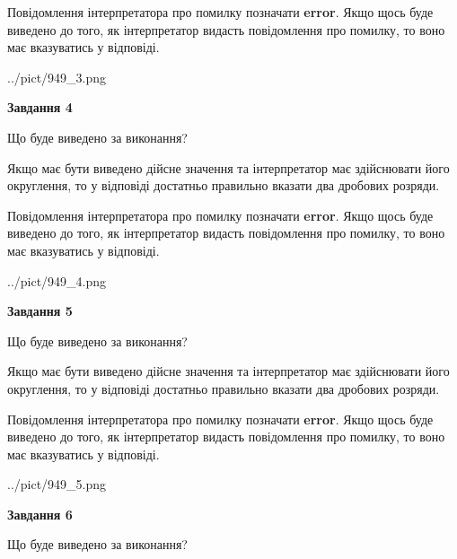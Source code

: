 \documentclass[12pt, ukrainian]{article}
\begin{document}
{\begin {Large}
Повідомлення інтерпретатора про помилку позначати \textbf{error}.
Якщо щось буде виведено до того, як інтерпретатор видасть повідомлення про помилку, 
то воно має вказуватись у відповіді. \par

\begin{center}
	{../pict/949_3.png}
\end{center}
\newpage

{\begin {center}\textbf{Завдання 4}\end {center}}\par
Що буде виведено за виконання? \par

Якщо має бути виведено дійсне значення та інтерпретатор має здійснювати його округлення, 
то у відповіді достатньо правильно вказати два дробових розряди.

Повідомлення інтерпретатора про помилку позначати \textbf{error}.
Якщо щось буде виведено до того, як інтерпретатор видасть повідомлення про помилку, 
то воно має вказуватись у відповіді. \par

\begin{center}
	{../pict/949_4.png}
\end{center}
\newpage

{\begin {center}\textbf{Завдання 5}\end {center}}\par
Що буде виведено за виконання? \par

Якщо має бути виведено дійсне значення та інтерпретатор має здійснювати його округлення, 
то у відповіді достатньо правильно вказати два дробових розряди.

Повідомлення інтерпретатора про помилку позначати \textbf{error}.
Якщо щось буде виведено до того, як інтерпретатор видасть повідомлення про помилку, 
то воно має вказуватись у відповіді. \par

\begin{center}
	{../pict/949_5.png}
\end{center}
\newpage

{\begin {center}\textbf{Завдання 6}\end {center}}\par
Що буде виведено за виконання? \par


\end{Large}}
\end{document}

